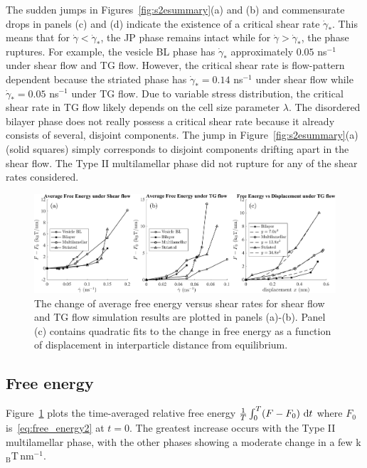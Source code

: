 \documentclass[prb,preprint,showpacs,preprintnumbers,amsmath,amssymb,longbibliography]{revtex4-2}
\newcommand{\KBT}{k$_{\text{B}}$T}
\begin{document}
The sudden jumps in Figures~\ref{fig:s2esummary}(a) and (b) and
commensurate drops in panels (c) and (d) indicate the existence of a
critical shear rate $\dot\gamma_*$. This means that for $\dot\gamma < \dot\gamma_*$,
the JP phase remains intact while for $\dot\gamma > \dot\gamma_*$, the phase
ruptures. For example, the vesicle BL phase has $\dot\gamma_*$ approximately
$0.05$ ns$^{-1}$ under shear flow and TG flow. However, the critical
shear rate is flow-pattern dependent because the striated phase has
$\dot\gamma_* = 0.14$ ns$^{-1}$ under shear flow while $\dot\gamma_* = 0.05$
ns$^{-1}$ under TG flow. Due to variable stress distribution, the
critical shear rate in TG flow likely depends on the cell size parameter
$\lambda$. The disordered bilayer phase does not really possess a
critical shear rate because it already consists of several, disjoint
components. The jump in Figure~\ref{fig:s2esummary}(a) (solid squares)
simply corresponds to disjoint components drifting apart in the shear
flow. The Type II multilamellar phase did not rupture for any of the
shear rates considered.

\begin{figure}[t]
\begin{center}
\includegraphics[width=\textwidth]{FSummary.pdf}
\end{center}
\caption{\label{fig:fsummary}
  The change of average free energy versus shear rates for shear flow
  and TG flow simulation results are plotted in panels (a)-(b). Panel
  (c) contains quadratic fits to the change in free energy as a function
  of displacement in interparticle distance from equilibrium.}
\end{figure}

\subsection{Free energy}
\label{sec:free-energy}
Figure~\ref{fig:fsummary} plots the time-averaged relative free energy
$\frac{1}{T}\int_0^T (F - F_0) \,\dif t$ where $F_0$
is~\eqref{eq:free_energy2} at $t = 0$. The greatest increase occurs with
the Type II multilamellar phase, with the other phases showing a
moderate change in a few \KBT\,nm$^{-1}$.
\end{document}

